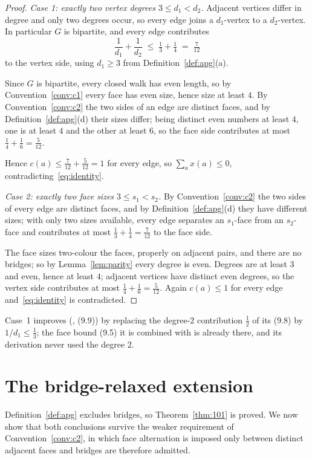\documentclass{baustms}
\theoremstyle{cupthm}
\theoremstyle{cupdefn}
\theoremstyle{cuprem}
\begin{document}
\begin{proof}
\emph{Case 1: exactly two vertex degrees $3 \le d_1 < d_2$.}
Adjacent vertices differ in degree and only two degrees occur, so every edge
joins a $d_1$-vertex to a $d_2$-vertex. In particular $G$ is bipartite, and every
edge contributes
\[
  \frac{1}{d_1} + \frac{1}{d_2} \;\le\; \tfrac13 + \tfrac14 \;=\; \tfrac{7}{12}
\]
to the vertex side, using $d_1 \ge 3$ from Definition~\ref{def:apg}(a).

Since $G$ is bipartite, every closed walk has even length, so by
Convention~\ref{conv:c1} every face has even size, hence size at least $4$. By
Convention~\ref{conv:c2} the two sides of an edge are distinct faces, and by
Definition~\ref{def:apg}(d) their sizes differ; being distinct even numbers at
least $4$, one is at least $4$ and the other at least $6$, so the face side
contributes at most $\tfrac14 + \tfrac16 = \tfrac{5}{12}$.

Hence $c(a) \le \tfrac{7}{12} + \tfrac{5}{12} = 1$ for every edge, so
$\sum_a x(a) \le 0$, contradicting~\eqref{eq:identity}.

\smallskip
\emph{Case 2: exactly two face sizes $3 \le s_1 < s_2$.}
By Convention~\ref{conv:c2} the two sides of every edge are distinct faces, and
by Definition~\ref{def:apg}(d) they have different sizes; with only two sizes
available, every edge separates an $s_1$-face from an $s_2$-face and contributes
at most $\tfrac13 + \tfrac14 = \tfrac{7}{12}$ to the face side.

The face sizes two-colour the faces, properly on adjacent pairs, and there are no
bridges; so by Lemma~\ref{lem:parity} every degree is even. Degrees are at least
$3$ and even, hence at least $4$; adjacent vertices have distinct even degrees,
so the vertex side contributes at most $\tfrac14+\tfrac16 = \tfrac{5}{12}$. Again
$c(a) \le 1$ for every edge and~\eqref{eq:identity} is contradicted.
\end{proof}

Case~1 improves (\cite{AHSSV2015}, (9.9)) by replacing the degree-$2$
contribution $\tfrac12$ of its (9.8) by $1/d_1 \le \tfrac13$; the face bound
(9.5) it is combined with is already there, and its derivation never used the
degree $2$.

\section{The bridge-relaxed extension}\label{sec:c2}

Definition~\ref{def:apg} excludes bridges, so Theorem~\ref{thm:101} is proved.
We now show that both conclusions survive the weaker requirement of
Convention~\ref{conv:c2}, in which face alternation is imposed only between
distinct adjacent faces and bridges are therefore admitted.
\end{document}
